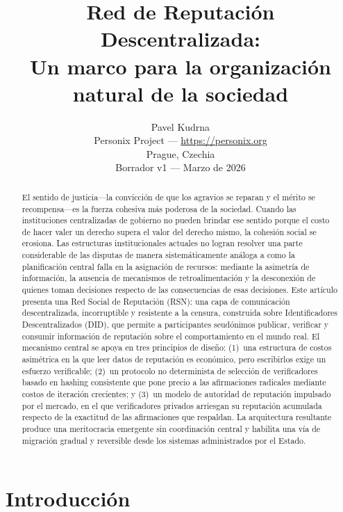 \documentclass[11pt,a4paper,twocolumn]{article}
\title{\textbf{Red de Reputación Descentralizada:\\Un marco para la organización natural de la sociedad}}
\author{Pavel Kudrna\\Personix Project --- \url{https://personix.org}\\Prague, Czechia\\Borrador v1 --- Marzo de 2026}
\date{}
\begin{document}
\maketitle

\begin{abstract}
El sentido de justicia---la convicción de que los agravios se reparan y el mérito se recompensa---es la fuerza cohesiva más poderosa de la sociedad. Cuando las instituciones centralizadas de gobierno no pueden brindar ese sentido porque el costo de hacer valer un derecho supera el valor del derecho mismo, la cohesión social se erosiona. Las estructuras institucionales actuales no logran resolver una parte considerable de las disputas de manera sistemáticamente análoga a como la planificación central falla en la asignación de recursos: mediante la asimetría de información, la ausencia de mecanismos de retroalimentación y la desconexión de quienes toman decisiones respecto de las consecuencias de esas decisiones. Este artículo presenta una Red Social de Reputación (RSN): una capa de comunicación descentralizada, incorruptible y resistente a la censura, construida sobre Identificadores Descentralizados (DID), que permite a participantes seudónimos publicar, verificar y consumir información de reputación sobre el comportamiento en el mundo real. El mecanismo central se apoya en tres principios de diseño: (1)~una estructura de costos asimétrica en la que leer datos de reputación es económico, pero escribirlos exige un esfuerzo verificable; (2)~un protocolo no determinista de selección de verificadores basado en hashing consistente que pone precio a las afirmaciones radicales mediante costos de iteración crecientes; y (3)~un modelo de autoridad de reputación impulsado por el mercado, en el que verificadores privados arriesgan su reputación acumulada respecto de la exactitud de las afirmaciones que respaldan. La arquitectura resultante produce una meritocracia emergente sin coordinación central y habilita una vía de migración gradual y reversible desde los sistemas administrados por el Estado.
\end{abstract}

\section{Introducción}
\end{document}
